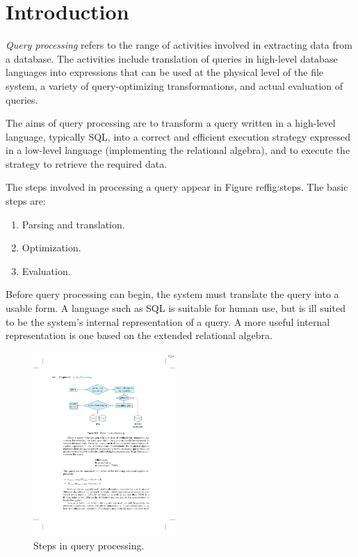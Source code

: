 \documentclass{vldb}
\newcommand{\be}{\begin{enumerate}}
\newcommand{\ee}{\end{enumerate}}
\newcommand{\ii}{\item}
\begin{document}
\section{Introduction}

\textit{Query processing} refers to the range of activities involved in extracting data from a database. The activities include translation of queries in high-level database languages into expressions that can be used at the physical level of the file system, a variety of query-optimizing transformations, and actual evaluation of queries.

The aims of query processing are to transform a query written in a high-level language, typically SQL, into a correct and efficient execution strategy expressed in a low-level language (implementing the relational algebra), and to execute the strategy to retrieve the required data.

The steps involved in processing a query appear in Figure ref{fig:steps}. The basic steps
are:

\be
\ii Parsing and translation.
\ii Optimization.
\ii Evaluation.
\ee

Before query processing can begin, the system must translate the query into
a usable form. A language such as SQL is suitable for human use, but is ill suited
to be the system’s internal representation of a query. A more useful internal
representation is one based on the extended relational algebra.

\begin{figure}[htb]
\centering
\includegraphics[width=0.48\textwidth]{query-processing-steps}
\caption{Steps in query processing.}
\label{fig:steps}
\end{figure}
\end{document}
